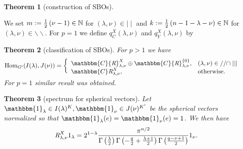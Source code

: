 \documentclass[12pt]{article} %
\newcommand{\assign}{:=}
\newtheorem{theorem}{Theorem}
\newcommand{\Hom}{\mbox{\normalfont Hom}}
\theoremstyle{definition}
\theoremstyle{exampstyle} \newtheorem{examp}[theorem]{Theorem}
\newcommand{\OpR}{\mbox{\it R}}
\newcommand{\mm}{\mid\mid}
\newcommand{\bb}{\backslash\backslash}
\begin{document}
\begin{theorem}[construction of SBOs]
\end{theorem}
We set $m:=\left(  \right)\in\N$ for $(\lambda,\nu)\in\mm$ and $k:=\left( n-1-\lambda-\nu \right)\in\N$ for $(\lambda,\nu)\in\bb$.
For $p=1$ we define $q_C^X(\lambda,\nu)$ and $q_Y^X(\lambda,\nu)$ by
\vspace{-3ex}
\begin{theorem}[classification of SBOs]
  For $p > 1$ we have\vspace{-1.5ex}
  \begin{eqnarray}
	  & \Hom_{G'}(I(\lambda),J(\nu))= \left\{
    \begin{array}{ll}
      \mathbbm{C} {\OpR}_{\lambda, \nu}^{X} \oplus \mathbbm{C}
      {\OpR}^{\{ 0 \}}_{\lambda, \nu}, & (\lambda, \nu) \in / /\cap 
      \mid\mid\mid\\
      \mathbbm{C} \OpR^X_{\lambda, \nu}, &
      \mbox{\normalfont otherwise.}\vspace{-1ex}
    \end{array} \right. &  \nonumber\vspace{-1.5ex}
  \end{eqnarray}
  For $p=1$ similar result was obtained.
\end{theorem}
\vspace{-2ex}
\begin{theorem}[spectrum for spherical vectors]
Let $_\lambda\in I(\lambda)^K,_\nu\in J(\nu)^{K'}$ be the spherical vectors normalized so that $_\lambda(e)=_\nu(e)=1$. We then have\vspace{-3.0ex}
	\[ \OpR^X_{\lambda, \nu} 1_{\lambda} = 2^{1 -
     \lambda} \frac{\pi^{n / 2}}{\Gamma \left( \frac{\lambda}{2} \right)
     \Gamma \left( - \frac{q}{2} + \frac{\lambda + 1}{2} \right) \Gamma \left(
     \frac{q - \nu + 1}{2} \right)} 1_{\nu}.\]
\end{theorem}
\vspace{-2ex}
\end{document}
